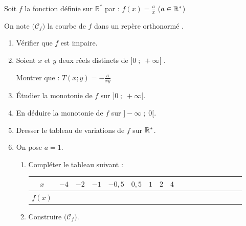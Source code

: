 \documentclass[10pt, a4paper]{article}
\begin{document}
\begin{Activite}[][20 min]
Soit $f$ la fonction définie sur $\mathbb{R^*}$ par : $f(x) = \frac{a}{x}$ \quad ($a \in \mathbb{R}^*$)

On note $\big(\mathcal{C}_f\big)$ la courbe de $f$ dans un repère orthonormé \Oij.
\begin{enumerate}[leftmargin=*,itemsep=0.5pt]
    \item Vérifier que $f$ est impaire.
    \item Soient $x$ et $y$ deux réels distincts de $\big]0 \;;\; +\infty\big[$ .

    Montrer que : \quad $T(x;y) = -\frac{a}{xy} $
    \item Étudier la monotonie de $f$ sur $\big]0 \;;\; +\infty\big[$.
    \item En déduire la monotonie de $f$ sur $\big]-\infty \;;\; 0\big[$.
    \item Dresser le tableau de variations de $f$ sur $\mathbb{R}^*$.
    \item On pose $a=1$.
    \begin{enumerate}[leftmargin=*,itemsep=0.5pt]
        \item Compléter le tableau suivant :
        \vspace{0.1cm}
         \begin{center}
            \renewcommand{\arraystretch}{1.2}
           \begin{tabular}{|Sc|*{8}{Sc|}}
    \hline
    $x$    & $-4$ & $-2$ & $-1$ & $-0,5$ & $0,5$ & $1$ & $2$ & $4$ \\ \hline
    $f(x)$ &      &      &      &        &       &     &     &     \\
    \hline
\end{tabular}
        \end{center}
        \vspace{0.1cm}
        \item Construire $\big(\mathcal{C}_f\big)$.
    \end{enumerate}
\end{enumerate}
\end{Activite}
\end{document}
